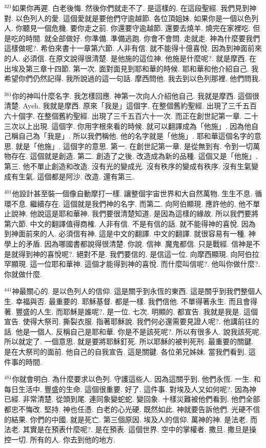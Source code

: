 \documentclass{book}
\begin{document}
$^{321}$如果你再遲.
白老後悔.
然後你們就走不了.
是這樣的.
在這段聖經.
我們見到神對.
以色列人的愛.
這個愛就是要他們守逾越節.
各位頂姐妹.
如果你是一個以色列人.
你聽見一個危機.
要你走之前.
你還要守逾越節.
還要去燒羊.
燒完在家裡吃.
但是吃的時間.
就全部做好.
你準備.
準備逃跑.
你會不會問.
走就走.
神為什麼要我們這樣做呢?.
希伯來書十一章第六節.
人非有信.
就不能得十億喜悅.
因為到神面前來的人.
必須信.
在原文說得很清楚.
是他施的這位神.
他施是什麼呢?.
就是摩西.
在出埃及第三章十四節.
第一次.
面對面見到耶和華的時候.
耶和華和他介紹自己.
我希望你們仍然記得.
我所說過的這一句話.
摩西問他.
我去到以色列那裡.
他們問我.

$^{361}$你的神叫什麼名字.
我怎樣回應.
神第一次向人介紹他自己.
我就是摩西.
這個很清楚.
Ayeh.
我就是摩西.
原來「我是」這個字.
在整個舊約聖經.
出現了三千五百六十個字.
在整個舊約聖經.
出現了三千五百六十一次.
而正在創世記第一章.
二十三次以上出現.
這個字.
你用字根來看的時候.
就可以翻譯成為「他施」.
因為他自己稱自己為「我是」.
所以我們稱他.
他的名字就是「他施」.
耶和華這個名字的意思.
就是「他施」.
這個字的意思.
第一.
在創世記第一章.
是從無到有.
令到一切萬物存在.
這個就是創造.
第二.
創造了之後.
改造成為新的品種.
這個又是「他施」.
第三.
他不單止創造和改造.
沒有光的變成光.
沒有秩序的變成有秩序.
沒有生氣變成有生氣.
這個都是阿沙.
改造.
還有第三.

$^{401}$他設計甚至裝一個像自動摩打一樣.
讓整個宇宙世界和大自然萬物.
生生不息.
循環不息.
繼續存在.
這個就是我們神的名字.
而第二.
向阿伯顯現.
應許他的.
他不單止說神.
他說這是耶和華神.
我們要很清楚知道.
是因為這樣的緣故.
所以我們要將第六節.
中文的翻譯值得商榷.
人非有信.
不是有信的話.
就不能得神的喜悅.
因為到神面前來的人.
必須信有神.
這是中文的翻譯.
中文的翻譯.
就很容易有一種.
神學上的矛盾.
因為哪國書都說得很清楚.
你說.
信神.
魔鬼都信.
只是戰經.
信神是不是就得到神的喜悅呢?.
絕對不是.
我們要信的.
是信這一位.
向摩西顯現.
向阿伯拉罕顯現.
這一位耶和華神.
這個才能得到神的喜悅.
而什麼叫信呢?.
他叫你做什麼?.
你就做什麼.

$^{441}$神最關心的.
是以色列人的信仰.
這是關乎到永恆的東西.
這是關乎到我們整個人生.
幸福與否.
最重要的.
耶穌基督.
都是一樣.
我們信他.
不單得著永生.
而且會得著.
豐盛的人生.
而耶穌是誰呢?.
是一位.
七次.
明顯的.
都宣告.
我就是我是.
這個宣告.
使得大祭司.
撕裂衣服.
指著耶穌說.
我們何必還需要見證人呢?.
他講前往的話.
他是一個人.
反稱自己是耶和華.
你是不是該死呢?.
所以有很多人.
說我該死呢.
所以就定了.
一個意思.
就是要將耶穌釘死.
所以耶穌的被判死刑.
最重要的關鍵.
是在大祭司的面前.
他自己的自我宣告.
這是關鍵.
各位弟兄姊妹.
當我們看到.
這件事的時間.

$^{481}$你就會明白.
為什麼要求以色列.
守護這些人.
因為這關乎到.
他們永恆.
一生.
和每日生活中.
豐盛的生命.
這個很重要.
好了.
這件事.
對埃及人又如何呢?.
因為神已經.
非常清楚.
從頭到尾.
連同象變蛇蛇.
變回象.
十樣災難被他們看到.
他們全部都忠不悔改.
堅持.
神也任憑.
白老的心光硬.
既然如此.
神就要告訴他們.
光硬不信的結果.
你們的中國.
就是死亡.
第三個原因.
埃及人的信仰.
萬神的神.
是法老.
而法老.
其實是在預表什麼呢?.
是在預表.
這個世界.
空中的掌權者.
撒旦.
撒旦是操控一切.
所有的人.
你去到他的地方.
\end{document}
